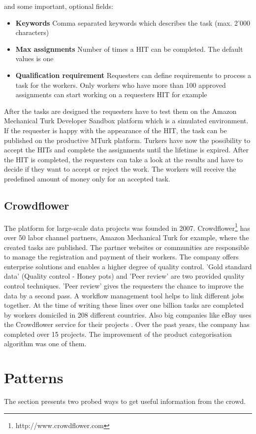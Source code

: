 and some important, optional fields: 
\begin{itemize}
	\item \textbf{Keywords} Comma separated keywords which describes the task (max. 2'000 characters) 
	\item \textbf{Max assignments} Number of times a HIT can be completed. The default values is one 
	\item \textbf{Qualification requirement} Requesters can define requirements to process a task for the workers. Only workers who have more than 100 approved assignments can start working on a requesters HIT for example 
\end{itemize}
After the tasks are designed the requesters have to test them on the Amazon Mechanical Turk Developer Sandbox platform which is a simulated environment. If the requester is happy with the appearance of the HIT, the task can be published on the productive MTurk platform. Turkers have now the possibility to accept the HITs and complete the assignments until the lifetime is expired. After the HIT is completed, the requesters can take a look at the results and have to decide if they want to accept or reject the work. The workers will receive the predefined amount of money only for an accepted task. 

\subsection{Crowdflower}
The platform for large-scale data projects was founded in 2007. Crowdflower\footnote{http://www.crowdflower.com} has over 50 labor channel partners, Amazon Mechanical Turk for example, where the created tasks are published. The partner websites or communities are responsible to manage the registration and payment of their workers. The company offers enterprise solutions and enables a higher degree of quality control. 'Gold standard data' (Quality control - Honey pots) and 'Peer review' are two provided quality control techniques. 'Peer review' gives the requesters the chance to improve the data by a second pass. A workflow management tool helps to link different jobs together. At the time of writing these lines over one billion tasks are completed by workers domiciled in 208 different countries. Also big companies like eBay uses the Crowdflower service for their projects \cite{crowdflower_casestudy}. Over the past years, the company has completed over 15 projects. The improvement of the product categorisation algorithm was one of them.
\section{Patterns}
The section presents two probed ways to get useful information from the crowd.
